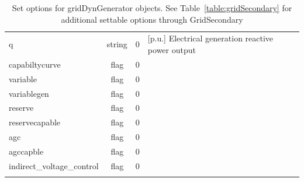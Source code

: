 \begin{longtable}{p{5cm} c c p{7cm}}
q & string & 0 & [p.u.] Electrical generation reactive power output\\
capabiltycurve & flag & 0 & \\
variable & flag & 0 & \\
variablegen & flag & 0 & \\
reserve & flag & 0 & \\
reservecapable & flag & 0 & \\
agc & flag & 0 & \\
agccapble & flag & 0 & \\
indirect\_voltage\_control & flag & 0 & \\
\hline
\caption{Set options for gridDynGenerator objects. See Table~\ref{table:gridSecondary} for additional settable options through GridSecondary}
\label{table:gridDynGenerator}
\end{longtable}
